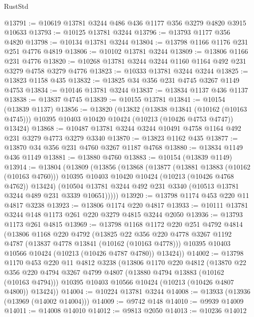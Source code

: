 \begin{lexlean}{RustStd}
\begin{coremodule}
{\begin{coremodule}
{{{{{{{{{{{{{{{{{{{{{{{{{{@13791 := @10619 @13781 @3244 @486 @436 @1177 @356 @3279 @4820 @3915 @10633
@13793 := @10125 @13781 @3244
@13796 := @13793 @1177 @356 @4820
@13798 := @10134 @13781 @3244
@13804 := @13798 @1166 @1176 @231 @251 @4776 @4819
@13806 := @10102 @13781 @3244
@13809 := @13806 @1166 @231 @4776
@13820 := @10268 @13781 @3244 @3244 @1160 @1164 @492 @231 @3279 @4758 @3279 @4776
@13823 := @10333 @13781 @3244 @3244
@13825 := @13823 @1158 @435
@13832 := @13825 @34 @356 @231 @4745 @3267 @1149 @4753
@13834 := @10146 @13781 @3244
@13837 := @13834 @1137 @436 @1137
@13838 := @13837 @4745
@13839 := @10155 @13781
@13841 := @10154 (@13839 @1137)
@13856 := @13820
    (@13832
      (@13838 @13841 (@10162 (@10163 @4745)))
      @10395
      @10403
      @10420
      @10424
      (@10213 (@10426 @4753 @4747))
      @13424)
@13868 := @10487 @13781 @3244 @3244 @10491 @4758 @1164 @492 @231 @3279 @4773 @3279 @3340
@13870 := @13823 @1162 @435
@13877 := @13870 @34 @356 @231 @4760 @3267 @1187 @4768
@13880 := @13834 @1149 @436 @1149
@13881 := @13880 @4760
@13883 := @10154 (@13839 @1149)
@13914 := @13804
    (@13809
      (@13856
        (@13868
          (@13877
            (@13881 @13883 (@10162 (@10163 @4760)))
            @10395
            @10403
            @10420
            @10424
            (@10213 (@10426 @4768 @4762))
            @13424)
          (@10504 @13781 @3244 @492 @231 @3340 (@10513 @13781 @3244 @489 @231 @3339 @10651)))))
@13920 := @13798 @1174 @453 @220 @11 @4817 @3238
@13923 := @13806 @1174 @220 @4817
@13933 := @10111 @13781 @3244 @148 @1173 @261 @220 @3279 @4815 @3244 @2050
@13936 := @13793 @1173 @261 @4815
@13969 := @13798
    @1168
    @1172
    @220
    @251
    @4792
    @4814
    (@13806
      @1168
      @220
      @4792
      (@13825
        @22
        @356
        @220
        @4778
        @3267
        @1192
        @4787
        (@13837 @4778 @13841 (@10162 (@10163 @4778)))
        @10395
        @10403
        @10566
        @10424
        (@10213 (@10426 @4787 @4780))
        @13424))
@14002 := @13798
    @1170
    @453
    @220
    @11
    @4812
    @3238
    (@13806
      @1170
      @220
      @4812
      (@13870
        @22
        @356
        @220
        @4794
        @3267
        @4799
        @4807
        (@13880 @4794 @13883 (@10162 (@10163 @4794)))
        @10395
        @10403
        @10566
        @10424
        (@10213 (@10426 @4807 @4800))
        @13424))
@14004 := @10224 @13781 @3244
@14008 := @13933 (@13936 (@13969 (@14002 @14004)))
@14009 := @9742 @148
@14010 := @9939 @14009
@14011 := @14008 @14010
@14012 := @9813 @2050
@14013 := @10236 @14012
}}}}}}}}}}}}}}}}}}}}}}}}}}
\end{coremodule}}
\end{coremodule}
\end{lexlean}
